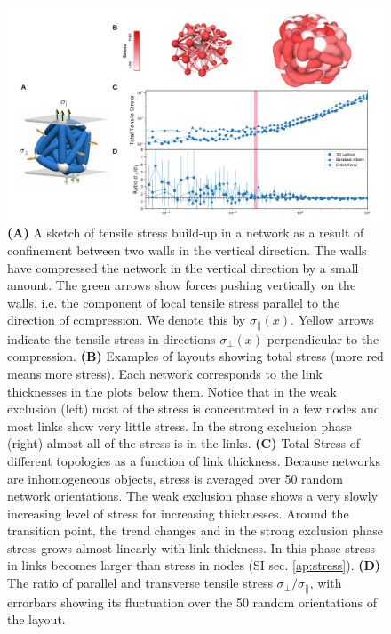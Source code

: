 \documentclass[nofootinbib,preprint,floatfix,titlepage,endfloats]{revtex4} %
\begin{document}
\begin{figure}
    \centering
    \includegraphics[width=1\columnwidth]{fig-09-19/stress-3.png}
    \caption{\scriptsize
    {\bf (A)} A sketch of tensile stress build-up in a network as a result of confinement between two walls in the vertical direction. 
    The walls have compressed the network in the vertical direction by a small amount.
    The green arrows show forces pushing vertically on the walls, i.e. the component of local tensile stress parallel to the direction of compression. 
    We denote this by $\sigma_\parallel(x)$. 
    Yellow arrows indicate the tensile stress in directions $\sigma_\perp(x)$
    perpendicular to the compression. 
    {\bf (B)} Examples of layouts showing total stress (more red means more stress).  
    Each network corresponds to the  link thicknesses in the plots below them.
    Notice that in the weak exclusion (left) most of the stress is concentrated in a few nodes and most links show very little stress. 
    In the strong exclusion phase (right) almost all of the stress is in the links. 
    {\bf (C)} Total Stress of different topologies as a function of link thickness. Because networks are inhomogeneous objects, stress is averaged over 50 random network orientations. The weak exclusion phase shows a very slowly increasing level of stress for increasing thicknesses. %
    Around the transition point, the trend changes and in the strong exclusion phase stress grows almost linearly with link thickness. 
    In this phase stress in links becomes larger than stress in nodes (SI sec. \ref{ap:stress}). 
    {\bf (D)} The ratio of parallel and transverse tensile stress $\sigma_\perp/\sigma_\parallel$, with errorbars showing its fluctuation over the 50 random orientations of the layout. 
}
\end{figure}
\end{document}
